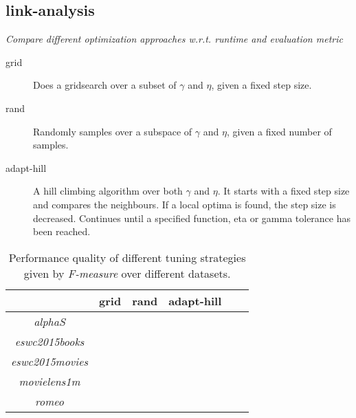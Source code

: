 
\subsection{link-analysis}

\textit{Compare different optimization approaches w.r.t. runtime and evaluation metric}

\begin{description}
    \item[grid]
        Does a gridsearch over a subset of $\gamma$ and $\eta$, given a fixed step size.
    \item[rand]
        Randomly samples over a subspace of $\gamma$ and $\eta$, given a fixed number of samples.
    \item[adapt-hill]
        A hill climbing algorithm over both $\gamma$ and $\eta$. It starts with a fixed step size and compares the neighbours. If a local optima is found, the step size is decreased. Continues until a specified function, eta or gamma tolerance has been reached.
\end{description}

\begin{table}[h!]
    \centering
    \begin{tabular}{| c | c | c | c | c | c | }
        \hline
        \textbf{}               & \textbf{grid} & \textbf{rand} & \textbf{adapt-hill} \\ \hline


        \textit{alphaS}         &               &               &               \\ \hline
        \textit{eswc2015books}  &               &               &               \\ \hline
        \textit{eswc2015movies} &               &               &               \\ \hline
        \textit{movielens1m}    &               &               &               \\ \hline
        \textit{romeo}          &               &               &               \\ \hline


    \end{tabular}
    \caption{Performance quality of different tuning strategies given by \textit{F-measure} over different datasets.}
    \label{tab:linkanalysis_tuning_F1}
\end{table}


